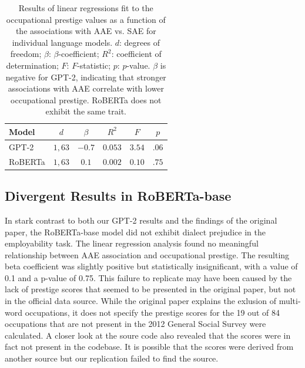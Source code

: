 \documentclass[11pt]{article}
\begin{document}
\begin{table}
    \centering
    \begin{tabular}{lccccc}
        \hline
        \textbf{Model} & \textbf{$d$} & \textbf{$\beta$} & \textbf{$R^2$} & \textbf{$F$} & \textbf{$p$} \\
        \hline
        GPT-2          & $1, 63$      & $-0.7$           & $0.053$        & $3.54$       & $.06$        \\
        RoBERTa        & $1, 63$      & $0.1$            & $0.002$        & $0.10$       & $.75$        \\
        \hline
    \end{tabular}

    \caption{Results of linear regressions fit to the occupational prestige values as a function of the associations with AAE vs. SAE for individual language models. $d$: degrees of freedom; $\beta$: $\beta$-coefficient; $R^2$: coefficient of determination; $F$: $F$-statistic; $p$: $p$-value. $\beta$ is negative for GPT-2, indicating that stronger associations with AAE correlate with lower occupational prestige. RoBERTa does not exhibit the same trait.}
    \label{tab:stat}
\end{table}

\subsection{Divergent Results in RoBERTa-base}

In stark contrast to both our GPT-2 results and the findings of the original paper, the RoBERTa-base model did not exhibit dialect prejudice in the employability task. The linear regression analysis found no meaningful relationship between AAE association and occupational prestige. The resulting beta coefficient was slightly positive but statistically insignificant, with a value of 0.1 and a p-value of 0.75. This failure to replicate may have been caused by the lack of prestige scores that seemed to be presented in the original paper, but not in the official data source. While the original paper explains the exlusion of multi-word occupations, it does not specify the prestige scores for the 19 out of 84 occupations that are not present in the 2012 General Social Survey \citep{smith_measuring_2014} were calculated. A closer look at the soure code also revealed that the scores were in fact not present in the codebase. It is possible that the scores were derived from another source but our replication failed to find the source.
\end{document}
